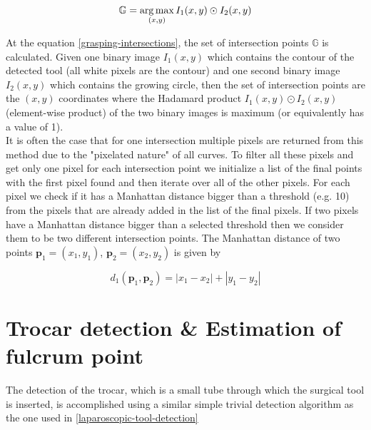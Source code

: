 \begin{equation}
\label{grasping-intersections}
\mathbb{G} = \operatorname*{arg\,max}_{(x,y)} I_1(x,y) \odot I_2(x,y)
\end{equation}

At the equation \ref{grasping-intersections}, the set of intersection points $\mathbb{G}$ is calculated. Given one binary image $I_1(x,y)$ which contains the contour of the detected tool (all white pixels are the contour) 
and one second binary image $I_2(x,y)$ which contains the growing circle, then the set of intersection points are the $(x, y)$ coordinates where the Hadamard product $I_1(x,y) \odot I_2(x,y)$ (element-wise product) of the 
two binary images is 
maximum (or equivalently has a value of 1).\\ 

It is often the case that for one intersection multiple pixels are returned from this method due to the "pixelated nature" of all curves. To filter all these pixels and get only one pixel for each intersection point 
we initialize a list of the final points with the first pixel found and then iterate over all of the other pixels. For each pixel we check if it has a Manhattan distance bigger than a threshold (e.g. 10) from the pixels that 
are already added in the list of the final pixels. If two pixels have a Manhattan distance bigger than a selected threshold then we consider them to be two different intersection points. The Manhattan distance of two 
points $\mathbf{p}_1=(x_1,y_1)$, ${\mathbf{p}_2=(x_2,y_2)}$ is given by

\begin{equation}
d_1(\mathbf{p}_1, \mathbf{p}_2) = |x_1 - x_2| + |y_1 - y_2|
\end{equation}

\section{Trocar detection \& Estimation of fulcrum point}

The detection of the trocar, which is a small tube through which the surgical tool is inserted, is accomplished using a similar simple trivial detection algorithm as the one used in \ref{laparoscopic-tool-detection}

